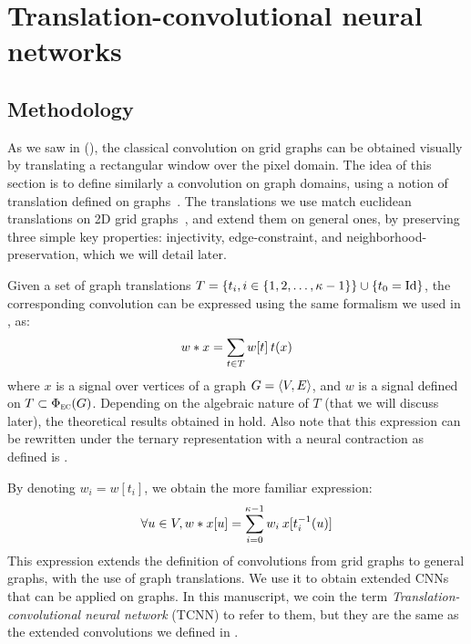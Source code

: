 \section{Translation-convolutional neural networks}
\label{sec:trans}

\subsection{Methodology}

As we saw in  (), the classical convolution on grid graphs can be obtained visually by translating a rectangular window over the pixel domain. The idea of this section is to define similarly a convolution on graph domains, using a notion of translation defined on graphs~\citep{pasdeloup2017translations}. The translations we use match euclidean translations on 2D grid graphs~\citep{GrePasViaGri201610}, and extend them on general ones, by preserving three simple key properties: injectivity, edge-constraint, and neighborhood-preservation, which we will detail later.

Given a set of graph translations $T = \{t_i, i \in \seq{\kappa - 1}\} \cup \{t_0 = \id \}$, the corresponding convolution can be expressed using the same formalism we used in , as:
\begin{gather}
w \ast x = \displaystyle\sum_{t \in T} w[t] \h{2} t(x)
\end{gather}
where $x$ is a signal over vertices of a graph $\gve$, and $w$ is a signal defined on $T \subset \Phi_{\EC}(G)$. Depending on the algebraic nature of $T$ (that we will discuss later), the theoretical results obtained in  hold. Also note that this expression can be rewritten under the ternary representation with a neural contraction as defined is .

By denoting $w_i = w[t_i]$, we obtain the more familiar expression:
\begin{gather}
\forall u \in V, w \ast x [u] = \displaystyle\sum_{i=0}^{\kappa-1} w_i \h{2} x[t_i^{-1}(u)]
\end{gather}
This expression extends the definition of convolutions from grid graphs to general graphs, with the use of graph translations. We use it to obtain extended CNNs that can be applied on graphs. In this manuscript, we coin the term \emph{Translation-convolutional neural network} (TCNN) to refer to them, but they are the same as the extended convolutions we defined in \cite{pasdeloup2017convolutional}.

